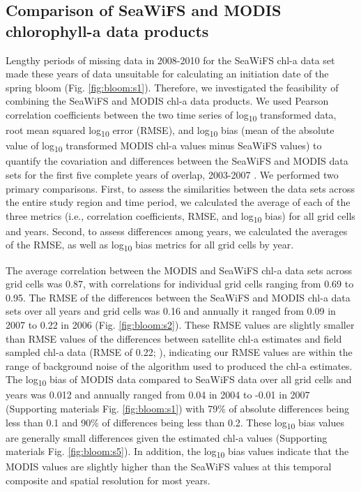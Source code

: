 \subsection{Comparison of SeaWiFS and MODIS chlorophyll-a data products}
\label{supp:bloom:A}

Lengthy periods of missing data in 2008-2010 for the SeaWiFS chl-a data set made
these years of data unsuitable for calculating an initiation date of the spring
bloom (Fig. \ref{fig:bloom:s1}). Therefore, we investigated the feasibility of
combining the SeaWiFS and MODIS chl-a data products. We used Pearson correlation
coefficients between the two time series of log\textsubscript{10} transformed
data, root mean squared log\textsubscript{10} error (RMSE), and
log\textsubscript{10} bias (mean of the absolute value of log\textsubscript{10}
transformed MODIS chl-a values minus SeaWiFS values) to quantify the covariation
and differences between the SeaWiFS and MODIS data sets for the first five
complete years of overlap, 2003-2007 \citep{Gregg2004, OReilly2000a, Zhang2006}
. We performed two primary comparisons. First, to assess the similarities
between the data sets across the entire study region and time period, we
calculated the average of each of the three metrics (i.e., correlation
coefficients, RMSE, and log\textsubscript{10} bias) for all grid cells and
years. Second, to assess differences among years, we calculated the averages of
the RMSE, as well as log\textsubscript{10} bias metrics for all grid cells by
year.

The average correlation between the MODIS and SeaWiFS chl-a data sets across
grid cells was 0.87, with correlations for individual grid cells ranging from
0.69 to 0.95. The RMSE of the differences between the SeaWiFS and MODIS chl-a
data sets over all years and grid cells was 0.16 and annually it ranged from
0.09 in 2007 to 0.22 in 2006 (Fig.  \ref{fig:bloom:s2}).  These RMSE values are
slightly smaller than RMSE values of the differences between satellite chl-a
estimates and field sampled chl-a data (RMSE of 0.22; \citep{OReilly2000a}),
indicating our RMSE values are within the range of background noise of the
algorithm used to produced the chl-a estimates. The log\textsubscript{10} bias
of MODIS data compared to SeaWiFS data over all grid cells and years was 0.012
and annually ranged from 0.04 in 2004 to -0.01 in 2007 (Supporting materials
Fig. \ref{fig:bloom:s1}) with 79\% of absolute differences being less than 0.1
and 90\% of differences being less than 0.2. These log\textsubscript{10} bias
values are generally small differences given the estimated chl-a values
(Supporting materials Fig.  \ref{fig:bloom:s5}).  In addition, the
log\textsubscript{10} bias values indicate that the MODIS values are slightly
higher than the SeaWiFS values at this temporal composite and spatial resolution
for most years.

